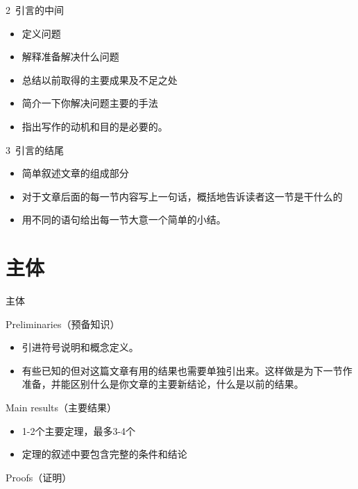 \documentclass[13pt]{ctexbeamer}
\begin{document}
\begin{frame}{2~引言的中间}
	\begin{itemize}
		
		\item 定义问题
		
		\item 解释准备解决什么问题
		\item 总结以前取得的主要成果及不足之处
		\item 简介一下你解决问题主要的手法
		\item 指出写作的动机和目的是必要的。
	\end{itemize}
\end{frame}

\begin{frame}{3~引言的结尾}
	\begin{itemize}
		
		\item 简单叙述文章的组成部分
		
		\item 对于文章后面的每一节内容写上一句话，概括地告诉读者这一节是干什么的
		\item 用不同的语句给出每一节大意一个简单的小结。
	\end{itemize}
\end{frame}

\section{主体}
\begin{frame}{主体}
	
	\setcounter{tocdepth}{2}
	\tableofcontents
	
	Preliminaries（预备知识）
	\begin{itemize}
		\item  引进符号说明和概念定义。
		\item  有些已知的但对这篇文章有用的结果也需要单独引出来。这样做是为下一节作准备，并能区别什么是你文章的主要新结论，什么是以前的结果。
	\end{itemize}
	Main results（主要结果）
		\begin{itemize}
		\item  1-2个主要定理，最多3-4个
		\item 定理的叙述中要包含完整的条件和结论
	\end{itemize}

Proofs（证明）
\end{frame}
\end{document}
